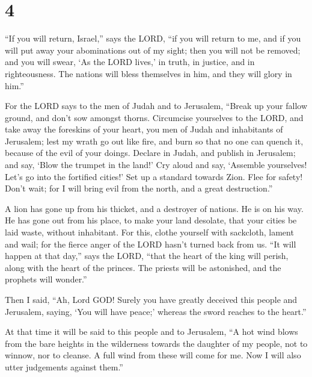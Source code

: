 \hypertarget{section-3}{%
\section{4}\label{section-3}}

 ``If you will return, Israel,'' says the LORD, ``if you
will return to me, and if you will put away your abominations out of my
sight; then you will not be removed;  and you will swear,
`As the LORD lives,' in truth, in justice, and in righteousness. The
nations will bless themselves in him, and they will glory in him.''

 For the LORD says to the men of Judah and to Jerusalem,
``Break up your fallow ground, and don't sow amongst thorns.
 Circumcise yourselves to the LORD, and take away the
foreskins of your heart, you men of Judah and inhabitants of Jerusalem;
lest my wrath go out like fire, and burn so that no one can quench it,
because of the evil of your doings.  Declare in Judah, and
publish in Jerusalem; and say, `Blow the trumpet in the land!' Cry aloud
and say, `Assemble yourselves! Let's go into the fortified cities!'
 Set up a standard towards Zion. Flee for safety! Don't
wait; for I will bring evil from the north, and a great destruction.''

 A lion has gone up from his thicket, and a destroyer of
nations. He is on his way. He has gone out from his place, to make your
land desolate, that your cities be laid waste, without inhabitant.
 For this, clothe yourself with sackcloth, lament and
wail; for the fierce anger of the LORD hasn't turned back from us.
 ``It will happen at that day,'' says the LORD, ``that the
heart of the king will perish, along with the heart of the princes. The
priests will be astonished, and the prophets will wonder.''

 Then I said, ``Ah, Lord GOD! Surely you have greatly
deceived this people and Jerusalem, saying, `You will have peace;'
whereas the sword reaches to the heart.''

 At that time it will be said to this people and to
Jerusalem, ``A hot wind blows from the bare heights in the wilderness
towards the daughter of my people, not to winnow, nor to cleanse.
 A full wind from these will come for me. Now I will also
utter judgements against them.''

